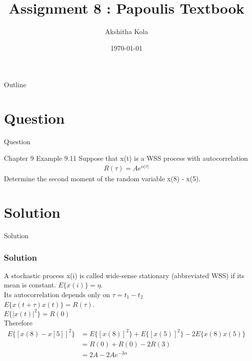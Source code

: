 \documentclass{beamer}
\title{Assignment 8 : Papoulis Textbook }
\author{Akshitha Kola}
\date{\today}
\begin{document}
\begin{frame}
    \titlepage 
\end{frame}

\logo{}

\begin{frame}{Outline}
    \tableofcontents
\end{frame}

\section{Question}
\begin{frame}{Question}
    \begin{block}{Chapter 9 Example 9.11}
     Suppose that x(t) is a WSS process with autocorrelation 
       \begin{align}     
         R(\tau) = Ae^{\alpha |\tau|} \nonumber
       \end{align}    
     Determine the second moment of the random variable x(8) - x(5). 
    \end{block}
\end{frame}

\section{Solution}
\begin{frame}{Solution}
\frametitle{Solution}
     A stochastic process x(i) is called wide-sense stationary (abbreviated WSS) if its mean is constant. $E\lbrace x(i)\rbrace = \eta$. \\
     Its autocorrelation depends only on $\tau = t_{1} - t_{2}$ \\ 
$E\lbrace x(t + \tau)x(t)\rbrace = R(\tau)$.\\
$E\lbrace |x(t)|^{2}\rbrace= R(0)$  \\

Therefore 
\begin{align}
     E\lbrace [x(8) - x[5]]^{2}\rbrace &= E\lbrace [x(8)]^{2}\rbrace + E\lbrace [x(5)]^{2}\rbrace - 2E\lbrace x(8)x(5)\rbrace \nonumber \\
     &= R(0) + R(0) - 2R(3) \nonumber\\
     &= 2A - 2Ae^{-3\alpha} \nonumber
\end{align}
\end{frame}
\end{document}
